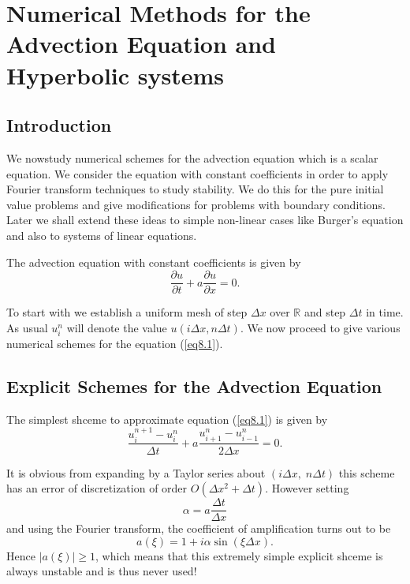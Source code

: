 
\chapter[Numerical Methods for the Advection Equation...]{Numerical
  Methods for the Advection Equation and Hyperbolic systems}\label{chap8}    

\section{Introduction}\label{chap8:sec8.1}

We now\pageoriginale study numerical schemes for the advection
equation which is a scalar equation. We consider the equation with
constant coefficients in order to apply Fourier transform techniques
to study stability. We do this for the pure initial value problems and
give modifications for problems with boundary conditions. Later we
shall extend these ideas to simple non-linear cases like Burger's
equation and also to systems of linear equations.  

The advection equation with constant coefficients is given by
\begin{equation*}
\frac{\partial u}{\partial t} + a \frac{\partial u}{\partial x} = 0.
\tag{8.1}\label{eq8.1}
\end{equation*}

To start with we establish a uniform mesh of step $\Delta x$ over
$\mathbb{R}$ and step $\Delta  t$ in time. As usual $u^n_i$ will
denote the value $u(i\Delta x, n \Delta t)$. We now proceed to give
various numerical schemes for the equation (\ref{eq8.1}). 

\section{Explicit Schemes for the Advection Equation}\label{chap8:sec8.2}

\begin{exam}\label{chap8:exam8.1}
The simplest shceme to approximate equation (\ref{eq8.1}) is given by
\begin{equation*}
\frac{u^{n+1}_i  - u^n_i}{\Delta t} + a \frac{u^n_{i+1} - u^n_{i-1}}{2 \Delta x} =0. 
\tag{8.2}\label{eq8.2}
\end{equation*}

It is obvious from expanding by a Taylor series about $(i \Delta x, \; n \Delta t)$ this scheme has an error of discretization of order $O(\Delta x^2 + \Delta t)$. However setting
\begin{equation*}
\alpha = a \frac{\Delta t}{\Delta x}\tag{8.3}\label{eq8.3}
\end{equation*}
and using the Fourier transform, the coefficient of amplification turns out to be 
\begin{equation*}
a (\xi) = 1 + i \alpha  \sin (\xi \Delta x).\tag{8.4}\label{eq8.4}
\end{equation*}\pageoriginale
Hence $|a (\xi)| \geq 1$, which means that this extremely simple explicit shceme is always unstable and is thus never used!
\end{exam}

